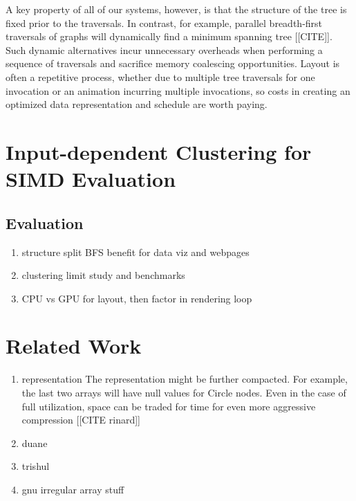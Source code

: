 A key property of all of our systems, however, is that the structure of the tree is fixed prior to the traversals.  In contrast, for example, parallel breadth-first traversals of graphs will dynamically find a minimum spanning tree [[CITE]]. Such dynamic alternatives incur unnecessary overheads when performing a sequence of traversals and sacrifice memory coalescing opportunities. Layout is often a repetitive process, whether due to multiple tree traversals for one invocation or an animation incurring multiple invocations, so costs in creating an optimized data representation and schedule are worth paying.

\section{Input-dependent Clustering for SIMD Evaluation}






\subsection{Evaluation}
\begin{enumerate}
\item structure split BFS  benefit for data viz and webpages
\item clustering limit study and benchmarks
\item CPU vs GPU for layout, then factor in rendering loop
\end{enumerate}
\section{Related Work}
\begin{enumerate}
\item representation The representation might be further compacted. For example, the last two arrays will have null values for Circle nodes. Even in the case of full utilization, space can be traded for time for even more aggressive compression [[CITE rinard]]
\item duane
\item trishul
\item gnu irregular array stuff
\end{enumerate}
